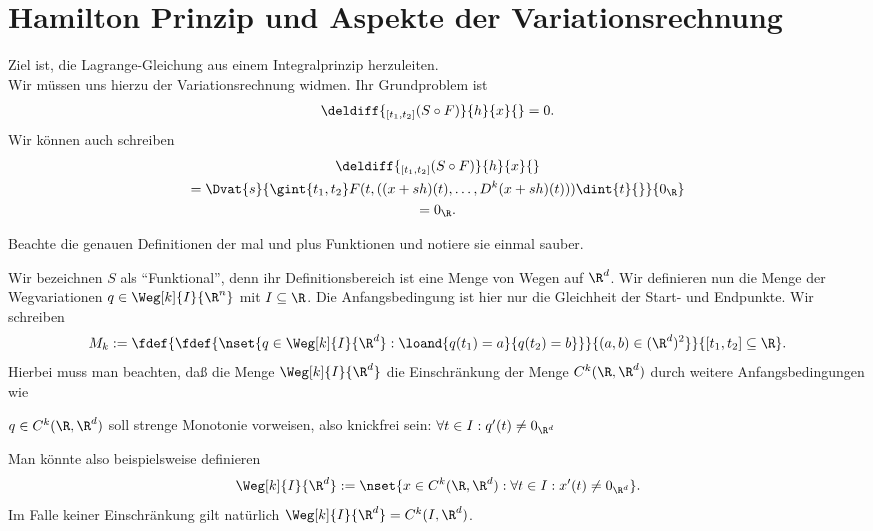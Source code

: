 \documentclass[../WiSe22ANA3.tex]{subfiles}
\begin{document}
	
	 \section{Hamilton Prinzip und Aspekte der Variationsrechnung}
	 	Ziel ist, die Lagrange-Gleichung aus einem Integralprinzip herzuleiten. \\
	 	Wir müssen uns hierzu der Variationsrechnung widmen. Ihr Grundproblem ist
	 	\begin{align*}
	 		\deldiff{_{[t_1,t_2]}(S\circ F)}{h}{x}{}=0. 
	 	\end{align*}
	 	Wir können auch schreiben
	 	\begin{multline*}
	 		\deldiff{_{[t_1,t_2]}(S\circ F)}{h}{x}{}\\
	 		=\Dvat{s}{\gint{t_1,t_2}F(t,((x+sh)(t),\dots,D^k(x+sh)(t)))\dint{t}{}}{0_\R} \\
	 		=0_\R.
	 	\end{multline*}
	 	\begin{Aufgabe}
	 		\nr Beachte die genauen Definitionen der mal und plus Funktionen und notiere sie einmal sauber. 
	 	\end{Aufgabe}
	 	Wir bezeichnen $S$ als \enquote{Funktional}, denn ihr Definitionsbereich ist eine Menge von Wegen auf $\R^d$. Wir definieren nun die Menge der Wegvariationen $q\in\Weg[k]{I}{\R^n}$ mit $I\subseteq\R$. Die Anfangsbedingung ist hier nur die Gleichheit der Start- und Endpunkte. Wir schreiben
	 	\begin{align*}
	 		M_k:=\fdef{\fdef{\nset{q\in \Weg[k]{I}{\R^d}:\loand{q(t_1)=a}{q(t_2)=b}}}{(a,b)\in(\R^d)^2}}{[t_1,t_2]\subseteq\R}.  
	 	\end{align*}
	 	Hierbei muss man beachten, daß die Menge $\Weg[k]{I}{\R^d}$ die Einschränkung der Menge $C^k(\R,\R^d)$ durch weitere Anfangsbedingungen wie
	 	\begin{clist}
	 		\item $q\in C^k(\R,\R^d)$ soll strenge Monotonie vorweisen, also knickfrei sein: $\forall t\in I:q'(t)\neq 0_{\R^d}$
	 	\end{clist}
	 	\begin{bsp}
	 		Man könnte also beispielsweise definieren
	 		\begin{align*}
	 			\Weg[k]{I}{\R^d}:=\nset{x\in C^k(\R,\R^d):\forall t\in I:x'(t)\neq 0_{\R^d}}. 
	 		\end{align*} 
	 		Im Falle keiner Einschränkung gilt natürlich $\Weg[k]{I}{\R^d}=C^k(I,\R^d)$. 
	 	\end{bsp}
\end{document}
